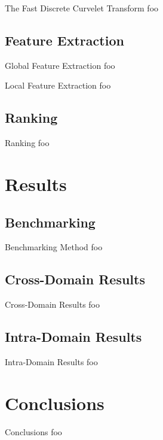 \documentclass{beamer}
\begin{document}
\begin{frame}{The Fast Discrete Curvelet Transform}
    foo
\end{frame}

\subsection{Feature Extraction}
\begin{frame}{Global Feature Extraction}
    foo
\end{frame}

\begin{frame}{Local Feature Extraction}
    foo
\end{frame}

\subsection{Ranking}
\begin{frame}{Ranking}
    foo
\end{frame}

\section{Results}
\subsection{Benchmarking}
\begin{frame}{Benchmarking Method}
    foo
\end{frame}

\subsection{Cross-Domain Results}
\begin{frame}{Cross-Domain Results}
    foo
\end{frame}

\subsection{Intra-Domain Results}
\begin{frame}{Intra-Domain Results}
    foo
\end{frame}

\section{Conclusions}
\begin{frame}{Conclusions}
    foo
\end{frame}

\end{document}
